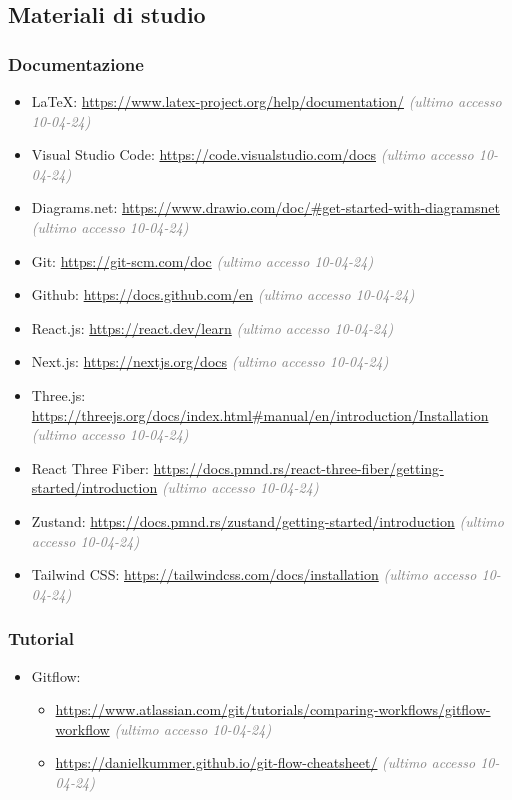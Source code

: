 \subsection{Materiali di studio}\label{sec:riferimenti_esterni:materiali_di_studio}
\subsubsection{Documentazione}
\begin{itemize}
        \item \LaTeX: \url{https://www.latex-project.org/help/documentation/} \textcolor{gray}{\textit{(ultimo accesso 10-04-24)}}
        \item Visual Studio Code: \url{https://code.visualstudio.com/docs} \textcolor{gray}{\textit{(ultimo accesso 10-04-24)}}
        \item Diagrams.net: \url{https://www.drawio.com/doc/#get-started-with-diagramsnet} \textcolor{gray}{\textit{(ultimo accesso 10-04-24)}}
        \item Git: \url{https://git-scm.com/doc} \textcolor{gray}{\textit{(ultimo accesso 10-04-24)}}
        \item Github: \url{https://docs.github.com/en} \textcolor{gray}{\textit{(ultimo accesso 10-04-24)}}
        \item React.js: \url{https://react.dev/learn} \textcolor{gray}{\textit{(ultimo accesso 10-04-24)}}
        \item Next.js: \url{https://nextjs.org/docs} \textcolor{gray}{\textit{(ultimo accesso 10-04-24)}}
        \item Three.js: \url{https://threejs.org/docs/index.html#manual/en/introduction/Installation} \textcolor{gray}{\textit{(ultimo accesso 10-04-24)}}
        \item React Three Fiber: \url{https://docs.pmnd.rs/react-three-fiber/getting-started/introduction} \textcolor{gray}{\textit{(ultimo accesso 10-04-24)}}
        \item Zustand: \url{https://docs.pmnd.rs/zustand/getting-started/introduction} \textcolor{gray}{\textit{(ultimo accesso 10-04-24)}}
        \item Tailwind CSS: \url{https://tailwindcss.com/docs/installation} \textcolor{gray}{\textit{(ultimo accesso 10-04-24)}}
    \end{itemize}
\subsubsection{Tutorial}
\begin{itemize}
        \item Gitflow:
            \begin{itemize}
                \item \url{https://www.atlassian.com/git/tutorials/comparing-workflows/gitflow-workflow} \textcolor{gray}{\textit{(ultimo accesso 10-04-24)}}
                \item \url{https://danielkummer.github.io/git-flow-cheatsheet/} \textcolor{gray}{\textit{(ultimo accesso 10-04-24)}}
            \end{itemize}       
                        
    \end{itemize}